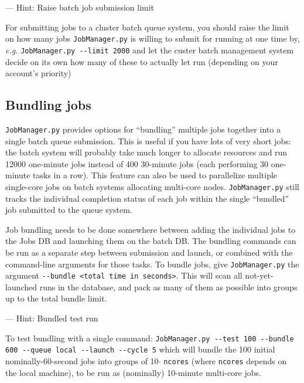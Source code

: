 \documentclass[12pt,english]{article}
\newenvironment{hint}[1][{}]{
\definecolor{shadecolor}{rgb}{.9,.9,.9}
\begin{shaded}
{\color{purple}--- Hint: #1}

}{\end{shaded}}
\newcommand{\cd}[1]{\texorpdfstring{{\color{blue} \texttt{#1}}}{#1}}
\newcommand{\eg}{{\em e.g.}}
\begin{document}
\begin{hint}[Raise batch job submission limit]
For submitting jobs to a cluster batch queue system, you should raise the limit on how many jobs
    \cd{JobManager.py} is willing to submit for running at one time by, \eg\newline
\cd{JobManager.py {-}{-}limit 2000} \newline
and let the custer batch management system decide on its own how many of these
    to actually let run (depending on your account's priority)
\end{hint}

\subsection{Bundling jobs}

\cd{JobManager.py} provides options for ``bundling'' multiple jobs together into a single batch queue submission.
This is useful if you have lots of very short jobs:
    the batch system will probably take much longer to allocate resources and run 12000 one-minute jobs instead of
    400 30-minute jobs (each performing 30 one-minute tasks in a row).
This feature can also be used to parallelize multiple single-core jobs on batch systems
    allocating multi-core nodes.
\cd{JobManager.py} still tracks the individual completion status of each job within the
    single ``bundled'' job submitted to the queue system.

Job bundling needs to be done somewhere between adding the individual jobs to the Jobs DB
    and launching them on the batch DB.
The bundling commands can be run as a separate step between submission and launch,
    or combined with the command-line arguments for those tasks.
To bundle jobs, give \cd{JobManager.py} the argument \cd{{-}{-}bundle <total time in seconds>}.
This will scan all not-yet-launched runs in the database, and pack as many of them as possible
    into groups up to the total bundle limit.

\begin{hint}[Bundled test run]
To test bundling with a single command: \newline
\cd{JobManager.py {-}{-}test 100 {-}{-}bundle 600 {-}{-}queue local {-}{-}launch {-}{-}cycle 5} \newline
which will bundle the 100 initial nominally-60-second jobs into groups of 10$\cdot$\cd{ncores}
    (where \cd{ncores} depends on the local machine), to be run as (nominally) 10-minute multi-core jobs.
\end{hint}
\end{document}
